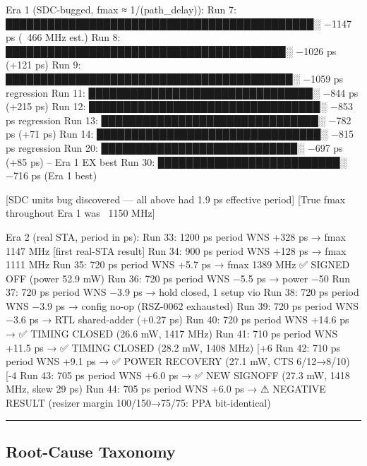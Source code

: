 \begin{record}

\begin{textblock}
Era 1 (SDC-bugged, fmax ≈ 1/(path_delay)):
Run  7:  ████████████████████████████████████████████░  −1147 ps  (~466 MHz est.)
Run  8:  ████████████████████████████████████████░     −1026 ps  (+121 ps)
Run  9:  █████████████████████████████████████████░    −1059 ps  regression
Run 11:  ████████████████████████████████░             −844 ps   (+215 ps)
Run 12:  █████████████████████████████████░            −853 ps   regression
Run 13:  ███████████████████████████████░              −782 ps   (+71 ps)
Run 14:  ████████████████████████████████░             −815 ps   regression
Run 20:  ████████████████████████████░                 −697 ps   (+85 ps) -- Era 1 EX best
Run 30:  ██████████████████████████░                   −716 ps   (Era 1 best)

  [SDC units bug discovered — all above had 1.9 ps effective period]
  [True fmax throughout Era 1 was ~1150 MHz]

Era 2 (real STA, period in ps):
Run 33:  1200 ps period  WNS +328 ps  → fmax 1147 MHz  [first real-STA result]
Run 34:   900 ps period  WNS +128 ps  → fmax 1111 MHz
Run 35:   720 ps period  WNS  +5.7 ps → fmax 1389 MHz  ✅ SIGNED OFF (power 52.9 mW)
Run 36:   720 ps period  WNS  −5.5 ps → power −50%
Run 37:   720 ps period  WNS  −3.9 ps → hold closed, 1 setup vio
Run 38:   720 ps period  WNS  −3.9 ps → config no-op (RSZ-0062 exhausted)
Run 39:   720 ps period  WNS  −3.6 ps → RTL shared-adder (+0.27 ps)
Run 40:   720 ps period  WNS +14.6 ps → ✅ TIMING CLOSED (26.6 mW, 1417 MHz)
Run 41:   710 ps period  WNS +11.5 ps → ✅ TIMING CLOSED (28.2 mW, 1408 MHz)  [+6%
Run 42:   710 ps period  WNS  +9.1 ps → ✅ POWER RECOVERY (27.1 mW, CTS 6/12→8/10)  [-4%
Run 43:   705 ps period  WNS  +6.0 ps → ✅ NEW SIGNOFF    (27.3 mW, 1418 MHz, skew 29 ps)
Run 44:   705 ps period  WNS  +6.0 ps → ⚠ NEGATIVE RESULT (resizer margin 100/150→75/75: PPA bit-identical)
\end{textblock}

\begin{center}\rule{0.5\linewidth}{0.5pt}\end{center}

\end{record}

\subsection{Root-Cause Taxonomy}\label{cr:run:asap7:root-cause-taxonomy}

